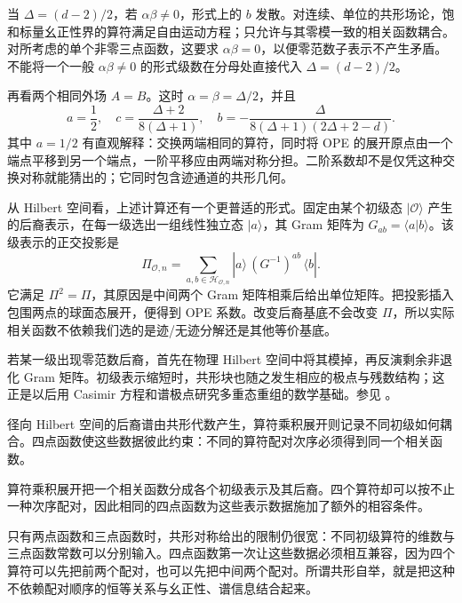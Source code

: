 当 $\Delta=(d-2)/2$，若 $\alpha\beta\ne0$，形式上的 $b$ 发散。对连续、单位的共形场论，饱和标量幺正性界的算符满足自由运动方程；只允许与其零模一致的相关函数耦合。对所考虑的单个非零三点函数，这要求 $\alpha\beta=0$，以便零范数子表示不产生矛盾。不能将一个一般 $\alpha\beta\ne0$ 的形式级数在分母处直接代入 $\Delta=(d-2)/2$。

再看两个相同外场 $A=B$。这时 $\alpha=\beta=\Delta/2$，并且
\begin{equation}\label{eq:ghs-identical-scalar-descendants}
 a=\frac12,\quad
 c=\frac{\Delta+2}{8(\Delta+1)},\quad
 b=-\frac{\Delta}{8(\Delta+1)(2\Delta+2-d)}.
\end{equation}
其中 $a=1/2$ 有直观解释：交换两端相同的算符，同时将 OPE 的展开原点由一个端点平移到另一个端点，一阶平移应由两端对称分担。二阶系数却不是仅凭这种交换对称就能猜出的；它同时包含迹通道的共形几何。


从 Hilbert 空间看，上述计算还有一个更普适的形式。固定由某个初级态 $|\mathcal O\rangle$ 产生的后裔表示，在每一级选出一组线性独立态 $|a\rangle$，其 Gram 矩阵为 $G_{ab}=\langle a|b\rangle$。该级表示的正交投影是
\begin{equation}\label{eq:ghs-ope-gram-projector}
 \Pi_{\mathcal O,n}=\sum_{a,b\in\mathcal H_{\mathcal O,n}}
 |a\rangle\,(G^{-1})^{ab}\,\langle b|.
\end{equation}
它满足 $\Pi^2=\Pi$，其原因是中间两个 Gram 矩阵相乘后给出单位矩阵。把投影插入包围两点的球面态展开，便得到 OPE 系数。改变后裔基底不会改变 $\Pi$，所以实际相关函数不依赖我们选的是迹/无迹分解还是其他等价基底。

若某一级出现零范数后裔，首先在物理 Hilbert 空间中将其模掉，再反演剩余非退化 Gram 矩阵。初级表示缩短时，共形块也随之发生相应的极点与残数结构；这正是以后用 Casimir 方程和谱极点研究多重态重组的数学基础。参见 \cite{ghs-rychkov,ghs-simmons,ghs-rychkov-tan}。

径向 Hilbert 空间的后裔谱由共形代数产生，算符乘积展开则记录不同初级如何耦合。四点函数使这些数据彼此约束：不同的算符配对次序必须得到同一个相关函数。


算符乘积展开把一个相关函数分成各个初级表示及其后裔。四个算符却可以按不止一种次序配对，因此相同的四点函数为这些表示数据施加了额外的相容条件。


只有两点函数和三点函数时，共形对称给出的限制仍很宽：不同初级算符的维数与三点函数常数可以分别输入。四点函数第一次让这些数据必须相互兼容，因为四个算符可以先把前两个配对，也可以先把中间两个配对。所谓共形自举，就是把这种不依赖配对顺序的恒等关系与幺正性、谱信息结合起来。


